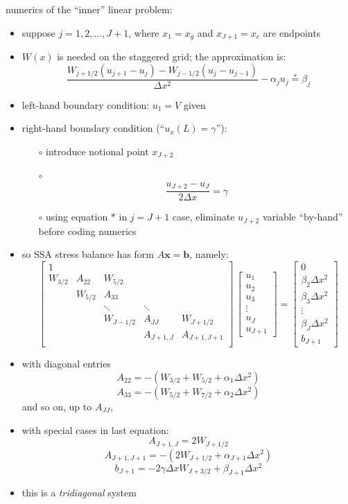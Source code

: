 \documentclass[titlepage,letterpaper,final,12pt]{scrartcl}
\begin{document}
numerics of the ``inner'' linear problem:

\begin{itemize}
\item suppose $j=1,2,\dots,J+1$, where $x_1 = x_g$ and $x_{J+1} = x_c$ are endpoints
\item $W(x)$ is needed on the staggered grid; the approximation is:
$$\frac{W_{j+1/2} (u_{j+1} - u_j) - W_{j-1/2} (u_{j} - u_{j-1})}{\Delta x^2} - \alpha_j u_j \stackrel{\ast}{=} \beta_j$$
\item left-hand boundary condition: $u_1 = V$ given
\item right-hand boundary condition (``$u_x(L)=\gamma$''):
  \begin{itemize}
  \item[$\circ$] introduce notional point $x_{J+2}$
  \item[$\circ$]
    $$\frac{u_{J+2} - u_J}{2 \Delta x} = \gamma$$
  \item[$\circ$] using equation $\ast$ in $j=J+1$ case, eliminate $u_{J+2}$ variable ``by-hand'' before coding numerics \nocite{MortonMayers}
  \end{itemize}
\end{itemize}

\begin{itemize}
\item so SSA stress balance has form  \quad $A \mathbf{x} = \mathbf{b}$, \quad namely:
$$
\begin{bmatrix}
1 &  &  &  &  \\
W_{3/2} & A_{22} & W_{5/2} &  &  \\
 & W_{5/2} & A_{33} &  &  \\
 &  & \ddots & \ddots &  \\
 &  & W_{J-1/2} & A_{JJ} & W_{J+1/2} \\
 &  &  & A_{J+1,J} & A_{J+1,J+1} \\
\end{bmatrix}\,
\begin{bmatrix}
u_1 \\ u_2 \\ u_3 \\ \vdots \\ u_J \\ u_{J+1}
\end{bmatrix}
=
\begin{bmatrix}
0 \\ \beta_2 \Delta x^2 \\ \beta_3 \Delta x^2 \\ \vdots \\ \beta_J \Delta x^2 \\ b_{J+1}
\end{bmatrix}
$$
\item with diagonal entries
$$A_{22} = -(W_{3/2}+W_{5/2}+\alpha_1 \Delta x^2)$$
$$A_{33} = -(W_{5/2}+W_{7/2}+\alpha_2 \Delta x^2)$$
and so on, up to $A_{JJ}$, 
\item with special cases in last equation:
$$A_{J+1,J} = 2 W_{J+1/2}$$
$$A_{J+1,J+1} = -(2 W_{J+1/2}+\alpha_{J+1}\Delta x^2)$$
$$b_{J+1} = -2 \gamma \Delta x W_{J+3/2} + \beta_{J+1} \Delta x^2$$
\item this is a \emph{tridiagonal} system
\end{itemize}
\end{document}
